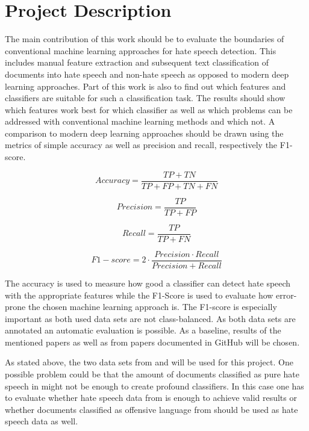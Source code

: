 \section{Project Description}
\label{section:description}

The main contribution of this work should be to evaluate the boundaries of conventional machine learning approaches for hate speech detection. This includes manual feature extraction and subsequent text classification of doc\-u\-ments into hate speech and non-hate speech as opposed to modern deep learning approaches. Part of this work is also to find out which features and classifiers are suitable for such a classification task. The results should show which features work best for which classifier as well as which problems can be addressed with conventional machine learning methods and which not. A comparison to modern deep learning approaches should be drawn using the metrics of simple accuracy as well as precision and recall, respectively the F1-score. 

\begin{equation}
Accuracy = \frac{TP + TN}{TP + FP + TN + FN}
\end{equation}

\begin{equation}
Precision = \frac{TP}{TP + FP}
\end{equation}

\begin{equation}
Recall = \frac{TP}{TP + FN}
\end{equation}

\begin{equation}
F1-score = 2 \cdot \frac{Precision \cdot Recall}{Precision + Recall}
\end{equation}

The accuracy is used to measure how good a classifier can detect hate speech with the appropriate features while the F1-Score is used to evaluate how error-prone the chosen machine learning approach is. The F1-score is especially important as both used data sets are not class-balanced. As both data sets are annotated an automatic evaluation is possible. As a baseline, results of the mentioned papers as well as from papers documented in GitHub will be chosen. 

As stated above, the two data sets from \cite{ThomasDavidson.2020} and \cite{OnadeGibert.2020} will be used for this project. One possible problem could be that the amount of documents classified as pure hate speech in \cite{ThomasDavidson.2020} might not be enough to create profound classifiers. In this case one has to evaluate whether hate speech data from \cite{OnadeGibert.2020} is enough to achieve valid results or whether documents classified as offensive language from \cite{ThomasDavidson.2020} should be used as hate speech data as well. 

